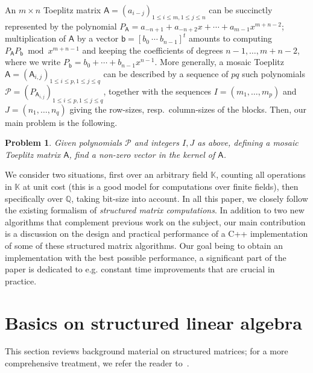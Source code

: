 \documentclass{sig-alternate}
\newcommand{\vb}{\ensuremath{\mathsf{b}}}
\newcommand{\mA}{\ensuremath{\mathsf{A}}}
\newcommand{\K}{\ensuremath{\mathbb{K}}}
\newcommand{\Q}{\ensuremath{\mathbb{Q}}}
\newtheorem{pbm}{Problem}
\begin{document}
An $m \times n$ Toeplitz matrix $\mA=(a_{i-j})_{1\le i \le m, 1 \le j
  \le n}$ can be succinctly represented by the polynomial
$P_\mA=a_{-n+1} + a_{-n+2} x + \cdots + a_{m-1} x^{m+n-2}$;
multiplication of $\mA$ by a vector $\vb=[b_0~\cdots~b_{n-1}]^t$
amounts to computing $P_\mA P_\vb \bmod x^{m+n-1}$ and keeping the
coefficients of degrees $n-1,\dots,m+n-2$, where we write $P_\vb=b_0 +
\cdots + b_{n-1} x^{n-1}$.  More generally, a mosaic Toeplitz
$\mA=(\mA_{i,j})_{1 \le i \le p,1 \le j \le q}$ can be described by a
sequence of $pq$ such polynomials $\mathscr{P}=(P_{\mA_{i,j}})_{1 \le
  i \le p,1 \le j \le q}$, together with the sequences
$I=(m_1,\dots,m_p)$ and $J=(n_1,\dots,n_q)$ giving the row-sizes,
resp.\ column-sizes of the blocks. Then, our main problem is the
following.

\begin{pbm}\label{pb:mosaic}
  Given polynomials $\mathscr{P}$ and integers $I,J$ as above, 
  defining a mosaic Toeplitz matrix $\mA$, find a non-zero
  vector in the kernel of $\mA$.
\end{pbm}
We consider two situations, first over an arbitrary field $\K$,
counting all operations in $\K$ at unit cost (this is a good model for
computations over finite fields), then specifically over $\Q$, taking
bit-size into account. In all this paper, we closely follow the
existing formalism of {\em structured matrix computations}. In
addition to two new algorithms that complement previous work on the
subject, our main contribution is a discussion on the design and
practical performance of a C++ implementation of some of these
structured matrix algorithms. Our goal being to obtain an
implementation with the best possible performance, a significant part
of the paper is dedicated to e.g. constant time improvements that are 
crucial in practice.


\section{Basics on structured linear algebra}\label{sec:basics}

This section reviews background material on structured matrices; for a
more comprehensive treatment, we refer the reader to~\cite{Pan01}.
\end{document}
